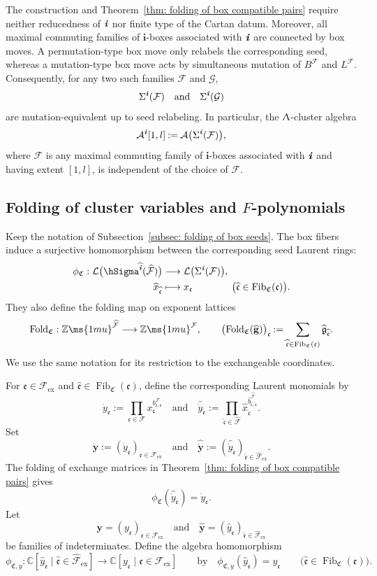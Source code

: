 \documentclass[12pt, leqno]{amsart}
\numberwithin{equation}{section}
\theoremstyle{plain}
\theoremstyle{definition}
\newcommand{\seteq}{\mathbin{:=}}
\newcommand{\ex}{\mathrm{ex}}
\newcommand{\g}{\mathfrak{g}}
\newcommand{\C}{\mathbb{C}}
\newcommand{\Z}{\mathbb{Z}\ms{1mu}}
\newcommand{\Fold}{{\rm Fold}}
\newcommand{\ii}{ \textbf{\textit{i}}}
\newcommand{\Fib}{\operatorname{Fib}}
\newcommand{\hb}{\widehat{b}}
\newcommand{\hg}{{\widehat{\g}}}
\newcommand{\hx}{\widehat{x}}
\newcommand{\hy}{\widehat{y}}
\newcommand{\hii}{{\widehat{\ii}}}
\newcommand{\frakC}{\mathfrak{C}}
\newcommand{\frakc}{\mathfrak{c}}
\newcommand{\frake}{\mathfrak{e}}
\newcommand{\hfrakc}{\widehat{\frakc}}
\newcommand{\hfrake}{\widehat{\frake}}
\newcommand{\dbfy}{\dot{\bfy}}
\newcommand{\dy}{\dot{y}}
\newcommand{\hdbfy}{\widehat{\dbfy}}
\newcommand{\hdy}{\widehat{\dy}}
\newcommand{\hbfg}{\widehat{\bfg}}
\newcommand{\bfg}{\mathbf{g}}
\newcommand{\bfi}{\mathbf{i}}
\newcommand{\bfy}{\mathbf{y}}
\newcommand{\calA}{\mathcal{A}}
\newcommand{\calF}{\mathcal{F}}
\newcommand{\calG}{\mathcal{G}}
\newcommand{\calL}{\mathcal{L}}
\newcommand{\hcalF}{{\widehat{\calF}}}
\newcommand{\qtq}[1][{and}]{\quad\text{{#1}}\quad}
\begin{document}
The construction and
Theorem~\ref{thm: folding of box compatible pairs} require neither
reducedness of \(\ii\) nor finite type of the Cartan datum.  Moreover,
all maximal commuting families of \(\bfi\)-boxes associated with
\(\ii\) are connected by box moves.   A
permutation-type box move only relabels the corresponding seed,
whereas a mutation-type box move acts by simultaneous mutation of
\(B^\calF\) and \(L^\calF\).
Consequently, for any
two such families \(\calF\) and \(\calG\),
\[
\Sigma^\ii(\calF) \quad\text{and}\quad \Sigma^\ii(\calG)
\]
are mutation-equivalent up to seed relabeling.  In particular, 
the $\Uplambda$-cluster algebra
\[
\calA^\ii[1,l]
\seteq
\calA\bigl(\Sigma^\ii(\calF)\bigr),
\]
where \(\calF\) is any maximal commuting family of \(\bfi\)-boxes
associated with \(\ii\) and having extent \([1,l]\), is independent
of the choice of \(\calF\).

\subsection{Folding of cluster variables and \texorpdfstring{\(F\)}{F}-polynomials}

Keep the notation of
Subsection~\ref{subsec: folding of box seeds}. The box fibers induce a surjective homomorphism between the
corresponding seed Laurent rings:
\begin{equation}\label{eq: box Laurent folding map}
\begin{aligned}
\phi_{\frakC}: \calL\bigl(\hSigma^\hii(\hcalF)\bigr) &\longrightarrow \calL\bigl(\Sigma^\ii(\calF)\bigr),\\
\hx_{\hfrakc} &\longmapsto x_\frakc \qquad\qquad \bigl(\hfrakc\in\Fib_{\frakC}(\frakc)\bigr).
\end{aligned}
\end{equation}
They also define the folding map on exponent lattices
\[
\Fold_{\frakC}:
\Z^{\hcalF}\longrightarrow\Z^\calF,
\qquad
\bigl(\Fold_{\frakC}(\hbfg)\bigr)_\frakc
\seteq
\sum_{\hfrakc\in\Fib_{\frakC}(\frakc)}
\hg_{\hfrakc}.
\]
We use the same notation for its restriction to the exchangeable
coordinates.

For \(\frake\in\calF_{\ex}\) and
\(\hfrake\in\Fib_{\frakC}(\frake)\), define the corresponding
 Laurent monomials by 
\[
\dy_\frake
\seteq
\prod_{\frakc\in\calF}
x_\frakc^{b_{\frakc,\frake}^\calF}
\qtq
\hdy_{\hfrake}
\seteq
\prod_{\hfrakc\in\hcalF}
\hx_{\hfrakc}^
{\hb_{\hfrakc,\hfrake}^{\hcalF}}.
\]
Set  
\[
\dbfy\seteq(\dy_\frake)_{\frake\in\calF_{\ex}}
\qtq
\hdbfy\seteq(\hdy_{\hfrake})_{\hfrake\in\hcalF_{\ex}}.
\]
The folding of exchange matrices in
Theorem~\ref{thm: folding of box compatible pairs} gives
\begin{equation}\label{eq: folding of column monomials}
\phi_{\frakC}(\hdy_{\hfrake})
=
\dy_\frake.
\end{equation} 
Let
\[
\bfy=(y_\frake)_{\frake\in\calF_{\ex}}
\qtq
\widehat{\bfy}=(\hy_{\hfrake})_{\hfrake\in\hcalF_{\ex}}
\]
be families of indeterminates.
Define the algebra homomorphism
\[
\phi_{\frakC,y}:
\C[\hy_{\hfrake}\mid\hfrake\in\hcalF_{\ex}]
\longrightarrow
\C[y_\frake\mid\frake\in\calF_{\ex}]
\qquad 
\text{by}
\quad 
\phi_{\frakC,y}(\hy_{\hfrake})=y_\frake
\qquad
\bigl(\hfrake\in\Fib_{\frakC}(\frake)\bigr).
\]
\end{document}
